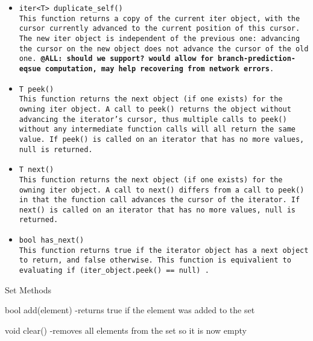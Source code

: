 \documentclass{book}
\begin{document}
\begin{itemize}

\item[] \tt iter<T> duplicate\_self() \rm \\

This function returns a copy of the current \tt iter \rm object, with the cursor
currently advanced to the current position of this cursor. The new \tt iter \rm
object is independent of the previous one: advancing the cursor on the new object
does not advance the cursor of the old one. \textbf{@ALL: should we support? would
allow for branch-prediction-eqsue computation, may help recovering from network
errors}.

\item[] \tt T peek() \rm \\

This function returns the next object (if one exists) for the owning \tt iter \rm
object. A call to \tt peek() \rm returns the object without advancing the iterator's
cursor, thus multiple calls to \tt peek() \rm without any intermediate function calls
will all return the same value. If \tt peek() \rm is called on an iterator that has
no more values, \tt null \rm is returned. 

\item[] \tt T next() \rm \\

This function returns the next object (if one exists) for the owning \tt iter \rm
object. A call to \tt next() \rm differs from a call to \tt peek() \rm in that the
function call advances the cursor of the iterator. If \tt next() \rm is called on
an iterator that has no more values, \tt null \rm is returned. 

\item[] \tt bool has\_next() \rm \\

This function returns \tt true \rm if the iterator object has a next object
to return, and \tt false \rm otherwise. This function is equivalient to evaluating
\tt if (iter\_object.peek() == null) \rm.

\end{itemize} 



Set Methods

bool add(element)
-returns true if the element was added to the set

void clear()
-removes all elements from the set so it is now empty
\end{document}
